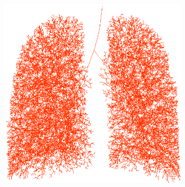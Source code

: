 \begin{figure}[htbp]
\begin{subfigure}{.53\linewidth}
  \label{fig:AirwayGeneration-a} 
\end{subfigure}
\hspace{.1in} %
\begin{subfigure}{.425\linewidth}%
  \includegraphics[width=\linewidth,trim={{.0\wd0} {.0\wd0} {.0\wd0} {.0\wd0}},clip]{ModelBasedAnalysis/Image/IPF511_Normal_FE_Airway.png}

\end{subfigure}
\end{figure}
